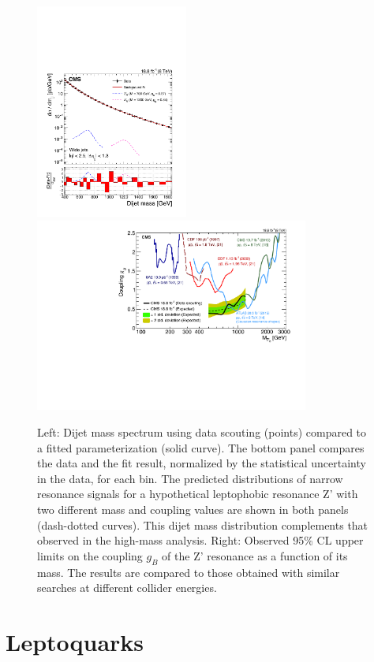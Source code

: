\documentclass[epj]{webofc}
\begin{document}
\begin{figure}[h]
\centering
\includegraphics[width=5cm,clip]{CMS-EXO-14-005_Figure_001.pdf}
\includegraphics[width=9cm,clip]{CMS-EXO-14-005_Figure_004.pdf}
\caption{Left:  Dijet mass spectrum using data scouting (points) compared to a fitted
  parameterization (solid curve). The bottom panel compares the data
  and the fit result, normalized by the statistical uncertainty in the
  data, for each bin. The predicted distributions of narrow resonance
  signals for a hypothetical leptophobic resonance Z' with two
  different mass and coupling values are shown in both panels
 (dash-dotted curves). This dijet mass distribution complements that 
observed in the high-mass analysis. Right: Observed 95\% CL upper
limits on the coupling $g_B$ of the Z' resonance as a function of its
mass. The results are compared to those obtained with similar searches
at different collider energies.}
\label{dijetScouting}       %
\end{figure}
%

\clearpage

\section{Leptoquarks}
\label{LQ}
\end{document}
